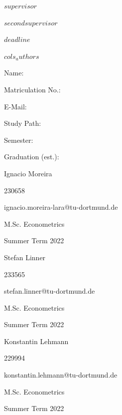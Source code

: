 \documentclass[$if(fontsize)$$fontsize$,$endif$$if(lang)$$lang$,$endif$$if(papersize)$$papersize$,$endif$$for(classoption)$$classoption$$sep$,$endfor$]{$documentclass$}
\begin{document}
\begin{titlepage}
		\noindent\begin{minipage}[t]{0.3\textwidth}
		\end{minipage}
		\begin{minipage}[t]{0.7\textwidth}
			\hspace{1cm}$supervisor$ 
		\end{minipage}
	
			\noindent\begin{minipage}[t]{0.3\textwidth}
		\end{minipage}
		\begin{minipage}[t]{0.7\textwidth}
			\hspace{1cm}$secondsupervisor$ 
		\end{minipage}
	
		\noindent\begin{minipage}[t]{0.3\textwidth}
		\end{minipage}
		\begin{minipage}[t]{0.7\textwidth}
			\hspace{1cm}$deadline$
		\end{minipage}
	\vfill
		\hrulefill
		
		\begin{multicols}{$cols_authors$}
			
			Name:
			
			Matriculation No.:
			
			E-Mail:
			
			Study Path:
			
			Semester:
			
			Graduation (est.):
			
			\columnbreak
			
			Ignacio Moreira
			
			230658
			
			ignacio.moreira-lara@tu-dortmund.de
			
			M.Sc. Econometrics
			
			
			Summer Term 2022
			
			\columnbreak
			
			Stefan Linner
			
			233565
			
			stefan.linner@tu-dortmund.de
			
			M.Sc. Econometrics
			
			
			Summer Term 2022
			
			\columnbreak
			
			Konstantin Lehmann
			
			229994
			
			konstantin.lehmann@tu-dortmund.de
			
			M.Sc. Econometrics
			
			
			Summer Term 2022
			
		\end{multicols}
		
	\end{titlepage}
	
\end{document}
